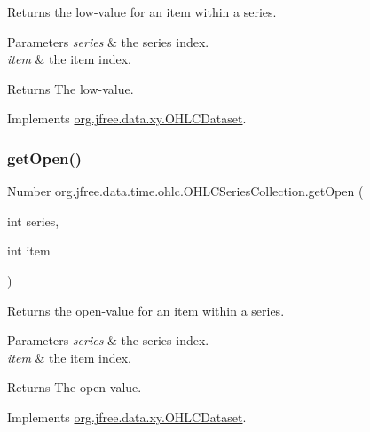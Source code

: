 Returns the low-\/value for an item within a series.


\begin{DoxyParams}{Parameters}
{\em series} & the series index. \\
\hline
{\em item} & the item index.\\
\hline
\end{DoxyParams}
\begin{DoxyReturn}{Returns}
The low-\/value. 
\end{DoxyReturn}


Implements \mbox{\hyperlink{interfaceorg_1_1jfree_1_1data_1_1xy_1_1_o_h_l_c_dataset_a19a2a153a113ed4f82eedd596e94d1ed}{org.\+jfree.\+data.\+xy.\+O\+H\+L\+C\+Dataset}}.

\mbox{\label{classorg_1_1jfree_1_1data_1_1time_1_1ohlc_1_1_o_h_l_c_series_collection_aab9642612da56d8b23037a2e0ab64f64}} 
\subsubsection{\texorpdfstring{get\+Open()}{getOpen()}}
{\footnotesize\ttfamily Number org.\+jfree.\+data.\+time.\+ohlc.\+O\+H\+L\+C\+Series\+Collection.\+get\+Open (\begin{DoxyParamCaption}\item[{int}]{series,  }\item[{int}]{item }\end{DoxyParamCaption})}

Returns the open-\/value for an item within a series.


\begin{DoxyParams}{Parameters}
{\em series} & the series index. \\
\hline
{\em item} & the item index.\\
\hline
\end{DoxyParams}
\begin{DoxyReturn}{Returns}
The open-\/value. 
\end{DoxyReturn}


Implements \mbox{\hyperlink{interfaceorg_1_1jfree_1_1data_1_1xy_1_1_o_h_l_c_dataset_a652f2a7a04925cc72472d390217fef08}{org.\+jfree.\+data.\+xy.\+O\+H\+L\+C\+Dataset}}.

